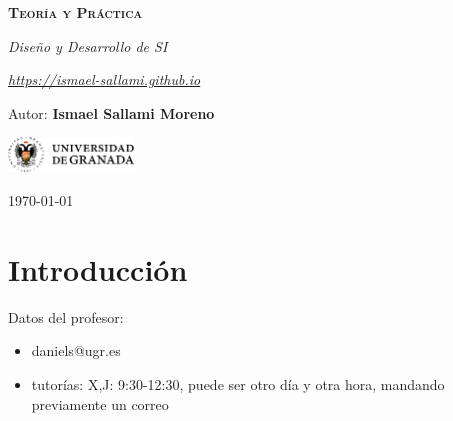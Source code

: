 \documentclass[12pt]{report} %
\providecommand{\tightlist}{%
  \setlength{\itemsep}{0pt}\setlength{\parskip}{0pt}}
\begin{document}
\begin{titlepage}
    \begin{center}
        \vspace*{2cm}
        
        {\Huge \bfseries\scshape Teoría y Práctica \par}
        \vspace{0.5cm}
        {\Large \itshape Diseño y Desarrollo de SI \par}
        \vspace{0.5cm}
        {\Large \itshape \href{https://ismael-sallami.github.io}{https://ismael-sallami.github.io} \par}


        \vfill
        
        {\LARGE Autor: \textbf{Ismael Sallami Moreno} \par}
        \vspace{0.3cm}
        
        \vspace{1cm}
        \includegraphics[width=0.25\textwidth]{../../../extraFiles/img/ugr.png} %
        \vspace{1cm}
        
        {\large \today}
    \end{center}
    
    \restoregeometry
\end{titlepage}


\thispagestyle{empty} %
\clearpage

\tableofcontents
\thispagestyle{empty} %
\clearpage

\hypertarget{introducciuxf3n}{%
\chapter{Introducción}\label{introducciuxf3n}}

Datos del profesor:

\begin{itemize}
\tightlist
\item
  daniels@ugr.es\\
\item
  tutorías: X,J: 9:30-12:30, puede ser otro día y otra hora, mandando
  previamente un correo
\end{itemize}
\end{document}
